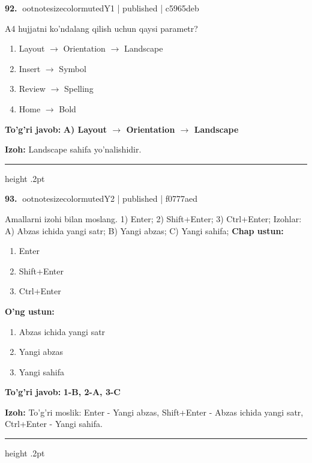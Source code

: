 \documentclass[10pt,a4paper]{article}
\begin{document}
\textbf{\color{ink}92.} {ootnotesizecolor{muted}Y1 | published | c5965deb}
\par
A4 hujjatni ko'ndalang qilish uchun qaysi parametr?
\begin{enumerate}[label=\Alph*),leftmargin=9mm]
\item Layout \ensuremath{\rightarrow} Orientation \ensuremath{\rightarrow} Landscape
\item Insert \ensuremath{\rightarrow} Symbol
\item Review \ensuremath{\rightarrow} Spelling
\item Home \ensuremath{\rightarrow} Bold
\end{enumerate}
\begin{tcolorbox}[enhanced,breakable,colback=teal!4,colframe=teal!55!black,boxrule=0.45pt,arc=1.2mm,left=2.8mm,right=2.8mm,top=2mm,bottom=2mm]
\textbf{\color{teal}To'g'ri javob:} \textbf{A) Layout \ensuremath{\rightarrow} Orientation \ensuremath{\rightarrow} Landscape}
\par\smallskip
\textbf{Izoh:} Landscape sahifa yo'nalishidir.
\end{tcolorbox}
\vspace{2mm}\hrule height .2pt\vspace{2mm}

\textbf{\color{ink}93.} {ootnotesizecolor{muted}Y2 | published | f0777aed}
\par
Amallarni izohi bilan moslang.  1) Enter;  2) Shift+Enter;  3) Ctrl+Enter;  Izohlar: A) Abzas ichida yangi satr;  B) Yangi abzas;  C) Yangi sahifa;
\textbf{Chap ustun:}\begin{enumerate}[label=\arabic*),leftmargin=9mm]
\item Enter
\item Shift+Enter
\item Ctrl+Enter
\end{enumerate}
\textbf{O'ng ustun:}\begin{enumerate}[label=\Alph*),leftmargin=9mm]
\item Abzas ichida yangi satr
\item Yangi abzas
\item Yangi sahifa
\end{enumerate}
\begin{tcolorbox}[enhanced,breakable,colback=teal!4,colframe=teal!55!black,boxrule=0.45pt,arc=1.2mm,left=2.8mm,right=2.8mm,top=2mm,bottom=2mm]
\textbf{\color{teal}To'g'ri javob:} \textbf{1-B, 2-A, 3-C}
\par\smallskip
\textbf{Izoh:} To'g'ri moslik: Enter - Yangi abzas, Shift+Enter - Abzas ichida yangi satr, Ctrl+Enter - Yangi sahifa.
\end{tcolorbox}
\vspace{2mm}\hrule height .2pt\vspace{2mm}
\end{document}
